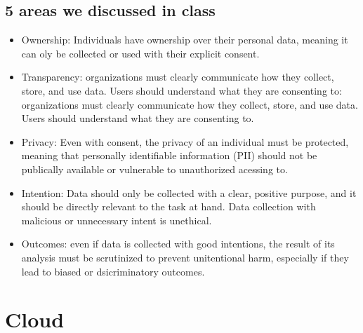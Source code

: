\documentclass{report}
\begin{document}
\subsection{5 areas we discussed in class}
\begin{itemize}
    \item Ownership: Individuals have ownership over their personal data, meaning it can oly be collected or used with their explicit consent.
    \item Transparency: organizations must clearly communicate how they collect, store, and use data. Users should understand what they are consenting to: organizations must clearly communicate how they collect, store, and use data. Users should understand what they are consenting to.
    \item Privacy: Even with consent, the privacy of an individual must be protected, meaning that personally identifiable information (PII) should not be publically available or vulnerable to unauthorized acessing to.
    \item Intention: Data should only be collected with a clear, positive purpose, and it should be directly relevant to the task at hand. Data collection with malicious or unnecessary intent is unethical.
    \item Outcomes: even if data is collected with good intentions, the result of its analysis must be scrutinized to prevent unitentional harm, especially if they lead to biased or dsicriminatory outcomes.
\end{itemize}
\section{Cloud}
\end{document}
